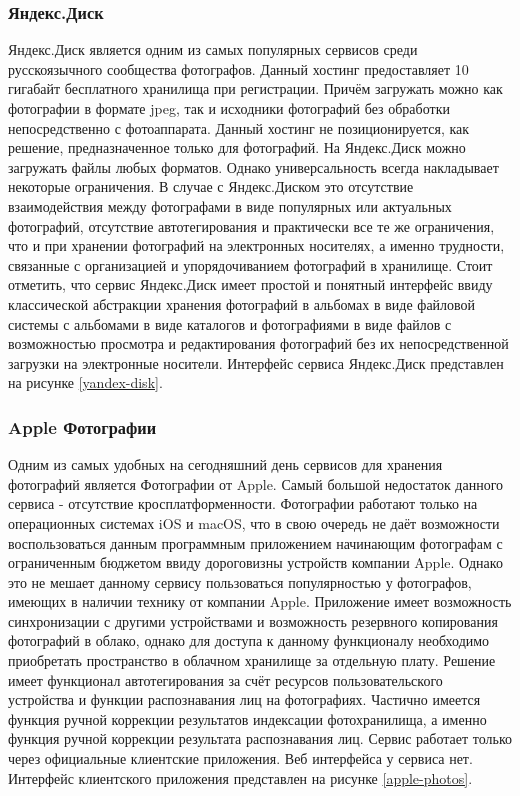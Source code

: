 \subsubsection{Яндекс.Диск}
Яндекс.Диск является одним из самых популярных сервисов среди русскоязычного сообщества фотографов. 
Данный хостинг предоставляет 10 гигабайт бесплатного хранилища при регистрации. 
Причём загружать можно как фотографии в формате jpeg, так и исходники фотографий без обработки непосредственно с фотоаппарата. 
Данный хостинг не позиционируется, как решение, предназначенное только для фотографий. 
На Яндекс.Диск можно загружать файлы любых форматов. 
Однако универсальность всегда накладывает некоторые ограничения. 
В случае с Яндекс.Диском это отсутствие взаимодействия между фотографами в виде популярных или актуальных фотографий, отсутствие автотегирования и практически все те же ограничения, что и при хранении фотографий на электронных носителях, а именно трудности, связанные с организацией и упорядочиванием фотографий в хранилище. 
Стоит отметить, что сервис Яндекс.Диск имеет простой и понятный интерфейс ввиду классической абстракции хранения фотографий в альбомах в виде файловой системы с альбомами в виде каталогов и фотографиями в виде файлов с возможностью просмотра и редактирования фотографий без их непосредственной загрузки на электронные носители. Интерфейс сервиса Яндекс.Диск представлен на рисунке \ref{yandex-disk}.


\subsubsection{Apple Фотографии}
Одним из самых удобных на сегодняшний день сервисов для хранения фотографий является Фотографии от Apple.
Самый большой недостаток данного сервиса - отсутствие кросплатформенности. 
Фотографии работают только на операционных системах iOS и macOS, что в свою очередь не даёт возможности воспользоваться данным программным приложением начинающим фотографам с ограниченным бюджетом ввиду дороговизны устройств компании Apple.
Однако это не мешает данному сервису пользоваться популярностью у фотографов, имеющих в наличии технику от компании Apple. 
Приложение имеет возможность синхронизации с другими устройствами и возможность резервного копирования фотографий в облако, однако для доступа к данному функционалу необходимо приобретать пространство в облачном хранилище за отдельную плату.
Решение имеет функционал автотегирования за счёт ресурсов пользовательского устройства и функции распознавания лиц на фотографиях.
Частично имеется функция ручной коррекции результатов индексации фотохранилища, а именно функция ручной коррекции результата распознавания лиц.
Сервис работает только через официальные клиентские приложения.
Веб интерфейса у сервиса нет.
Интерфейс клиентского приложения представлен на рисунке \ref{apple-photos}.

